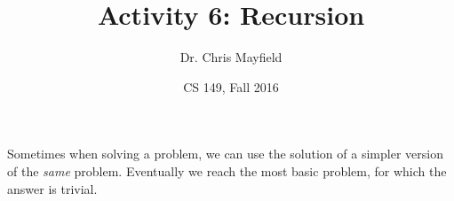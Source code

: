 \documentclass[12pt]{article}
\title{Activity 6: Recursion}
\author{Dr. Chris Mayfield}
\date{CS 149, Fall 2016}
\begin{document}
\maketitle

Sometimes when solving a problem, we can use the solution of a simpler version of the \emph{same} problem.
Eventually we reach the most basic problem, for which the answer is trivial.




%
\end{document}
